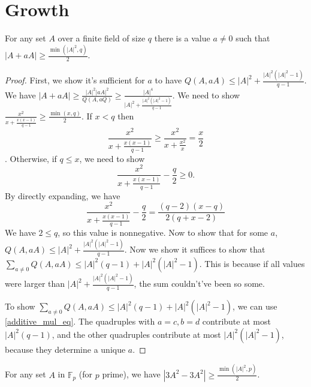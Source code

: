 \chapter{Growth}
\label{chap:growth}

\begin{theorem}
    \label{exists_grower}
    \leanok
    For any set $A$ over a finite field of size $q$ there is a value $a \neq 0$ such that
    $|A + a A| \geq \frac{\min(|A|^2, q)}2$.
\end{theorem}

\begin{proof}
    \leanok
    First, we show it's sufficient for $a$ to have $Q(A, aA) \leq |A|^2 + \frac{|A|^2 (|A|^2 - 1)}{q-1}$.
    We have $|A + a A| \geq \frac{|A|^2 |a A|^2}{Q(A, aQ)} \geq \frac{|A|^4}{|A|^2 + \frac{|A|^2 (|A|^2 - 1)}{q-1}}$.
    We need to show $\frac{x^2}{x + \frac{x(x-1)}{q-1}} \geq \frac{\min(x, q)}2$.
    If $x < q$ then
    $$\frac{x^2}{x + \frac{x (x - 1)}{q-1}} \geq \frac{x^2}{x + \frac{x^2}{x}} = \frac x2$$.
    Otherwise, if $q \leq x$, we need to show
        $$ \frac{x^2}{x + \frac{x (x - 1)}{q-1}} - \frac q2 \geq 0. $$
    By directly expanding, we have
        $$\frac{x^2}{x + \frac{x (x - 1)}{q-1}} - \frac q2 = \frac{(q-2) (x - q)}{2 (q + x - 2)}$$
    We have $2 \leq q$, so this value is nonnegative.
    Now to show that for some $a$, $Q(A, aA) \leq |A|^2 + \frac{|A|^2 (|A|^2 - 1)}{q-1}$.
    Now we show it suffices to show that $\sum_{a \neq 0} Q(A, a A) \leq |A|^2 (q-1) + |A|^2 (|A|^2 - 1)$.
    This is because if all values were larger than $|A|^2 + \frac{|A|^2 (|A|^2 - 1)}{q-1}$, the sum couldn't've been so some.

    To show $\sum_{a \neq 0} Q(A, a A) \leq |A|^2 (q-1) + |A|^2 (|A|^2 - 1)$, we can use \ref{additive_mul_eq}.
    The quadruples with $a = c, b = d$ contribute at most $|A|^2 (q-1)$, and the other quadruples contribute at most
    $|A|^2 (|A|^2 - 1)$, because they determine a unique $a$.
\end{proof}

\begin{theorem}
    \label{GUS}
    \leanok
    For any set $A$ in $\mathbb{F}_p$ (for $p$ prime), we have $|3 A^2 - 3 A^2| \geq \frac{\min(|A|^2, p)}2$.
\end{theorem}

